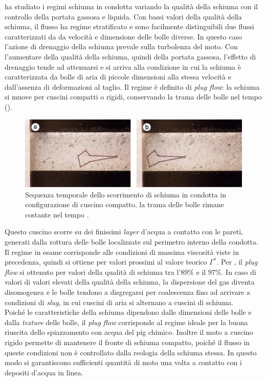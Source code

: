 \textcite{briceno2003self} ha studiato i regimi schiuma in condotta variando la qualità della schiuma con il controllo della portata gassosa e liquida. Con bassi valori della qualità della schiuma, il flusso ha regime stratificato e sono facilmente distinguibili due flussi caratterizzati da da velocità e dimensione delle bolle diverse. In questo caso l'azione di drenaggio della schiuma prevale sulla turbolenza del moto. Con l'aumentare della qualità della schiuma, quindi della portata gassosa, l'effetto di drenaggio tende ad attenuarsi e si arriva alla condizione in cui la schiuma è caratterizzata da bolle di aria di piccole dimensioni alla stessa velocità e dall'assenza di deformazioni al taglio. Il regime è definito di \textit{plug flow}: la schiuma si muove per cuscini compatti o rigidi, conservando la trama delle bolle nel tempo ().
\begin{figure}[htbp]
    \centering
    \includegraphics[width=.7\textwidth]{fig/test/selflubr}
    \caption{Sequenza temporale dello scorrimento di schiuma in condotta in configurazione di cuscino compatto, la trama delle bolle rimane costante nel tempo \parencite{briceno2003self}.} 
    \label{fig:selflubr}
\end{figure}
Questo cuscino scorre su dei finissimi \textit{layer} d'acqua a contatto con le pareti, generati dalla rottura delle bolle localizzate sul perimetro interno della condotta. Il regime in esame corrisponde alle condizioni di massima viscosità viste in precedenza, quindi si ottiene per valori prossimi al valore teorico \(\Gamma^{*}\). Per \textcite{briceno2003self}, il \textit{plug flow} si ottenuto per valori della qualità di schiuma tra l'89\% e il 97\%. In caso di valori di valori elevati della qualità della schiuma, la dispersione del gas diventa disomogenea e le bolle tendono a disgregarsi per coalescenza fino ad arrivare a condizioni di \textit{slug}, in cui cuscini di aria si alternano a cuscini di schiuma.\\
Poiché le caratteristiche della schiuma dipendono dalle dimensioni delle bolle e dalla \textit{texture} delle bolle, il \textit{plug flow} corrisponde al regime ideale per la buona riuscita dello spiazzamento con acqua del pig chimico. Inoltre il moto a cuscino rigido permette di mantenere il fronte di schiuma compatto, poiché il flusso in queste condizioni non è controllato dalla reologia della schiuma stessa. In questo modo si garantiscono sufficienti quantità di moto una volta a contatto con i depositi d'acqua in linea.\\
